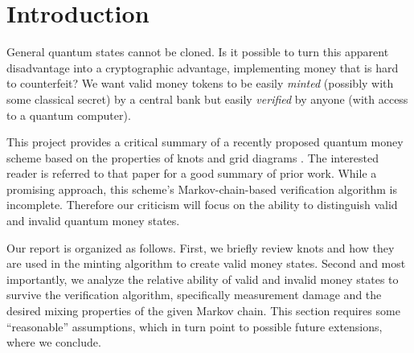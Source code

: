 \section{Introduction}

General quantum states cannot be cloned. Is it possible to
turn this apparent disadvantage into a cryptographic advantage,
implementing money that is hard to counterfeit?
We want valid money tokens to be easily \emph{minted}
(possibly with some classical secret) by a central
bank but easily \emph{verified}
by anyone (with access to a quantum computer).

This project provides a critical summary of a recently proposed 
 quantum money scheme based on the properties
of knots and grid diagrams \cite{Farhi2010}.
The interested reader is referred to that paper for
a good summary of prior work.
While a promising approach, this scheme's Markov-chain-based
verification algorithm is incomplete.
Therefore our criticism will focus on the ability to
distinguish valid and invalid
quantum money states.

Our report is organized as follows.
First, we briefly review knots and how they are used
in the minting algorithm to create valid money states.
Second and most importantly, we analyze the relative ability of
valid and invalid money states to survive the
verification algorithm, specifically measurement damage and
the
desired mixing properties of the given Markov chain. This section
requires some ``reasonable'' assumptions, which in turn point to
possible future extensions, where we conclude.





